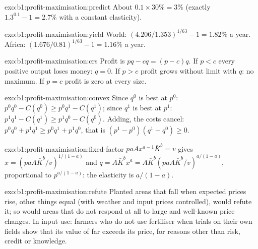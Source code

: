 \begin{solution}{exo:b1:profit-maximisation:predict}
About $0.1 \times 30\% = 3\%$ (exactly $1.3^{0.1} - 1 = 2.7\%$ with a constant elasticity).
\end{solution}

\begin{solution}{exo:b1:profit-maximisation:yield}
World: $(4.206/1.353)^{1/63} - 1 = 1.82\%$ a year. Africa:
$(1.676/0.81)^{1/63} - 1 = 1.16\%$ a year.
\end{solution}

\begin{solution}{exo:b1:profit-maximisation:crs}
Profit is $pq - cq = (p - c)q$. If $p < c$ every positive output loses money:
$q = 0$. If $p > c$ profit grows without limit with $q$: no maximum. If $p = c$
profit is zero at every size.
\end{solution}

\begin{solution}{exo:b1:profit-maximisation:convex}
Since $q^0$ is best at $p^0$: $p^0q^0 - C(q^0) \ge p^0q^1 - C(q^1)$; since $q^1$ is
best at $p^1$: $p^1q^1 - C(q^1) \ge p^1q^0 - C(q^0)$. Adding, the costs cancel:
$p^0q^0 + p^1q^1 \ge p^0q^1 + p^1q^0$, that is $(p^1 - p^0)(q^1 - q^0) \ge 0$.
\end{solution}

\begin{solution}{exo:b1:profit-maximisation:fixed-factor}
$paAx^{a-1}\bar K^b = v$ gives $x = (paA\bar K^b/v)^{1/(1-a)}$ and
$q = A\bar K^bx^a = A\bar K^b(paA\bar K^b/v)^{a/(1-a)}$, proportional to
$p^{a/(1-a)}$: the elasticity is $a/(1 - a)$.
\end{solution}

\begin{solution}{exo:b1:profit-maximisation:refute}
Planted areas that fall when expected prices rise, other things equal (with
weather and input prices controlled), would refute it; so would areas that
do not respond at all to large and well-known price changes. In input use:
farmers who do not use fertiliser when trials on their own fields show that
its value of  far exceeds its price, for reasons other than
risk, credit or knowledge.
\end{solution}

